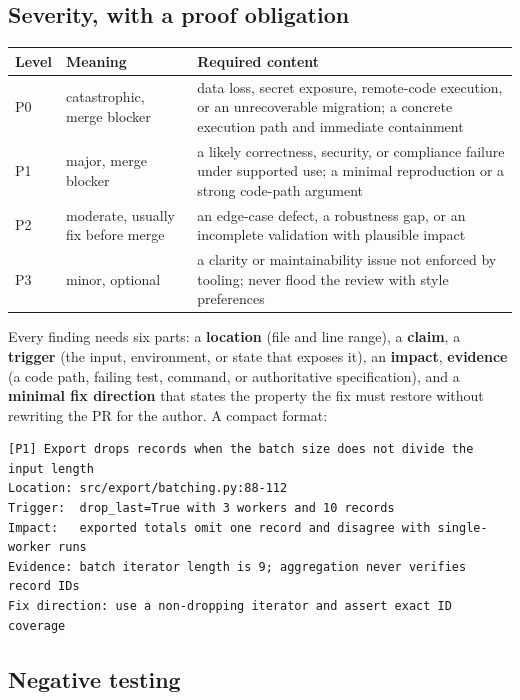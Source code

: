 \documentclass[11pt]{article}
\begin{document}
\subsection{Severity, with a proof obligation}

\begin{center}
\begin{tabularx}{\textwidth}{@{}l Y Y@{}}
\toprule
\textbf{Level} & \textbf{Meaning} & \textbf{Required content} \\
\midrule
P0 & catastrophic, merge blocker & data loss, secret exposure, remote-code execution, or an
  unrecoverable migration; a concrete execution path and immediate containment \\
P1 & major, merge blocker & a likely correctness, security, or compliance failure under
  supported use; a minimal reproduction or a strong code-path argument \\
P2 & moderate, usually fix before merge & an edge-case defect, a robustness gap, or an
  incomplete validation with plausible impact \\
P3 & minor, optional & a clarity or maintainability issue not enforced by tooling; never flood
  the review with style preferences \\
\bottomrule
\end{tabularx}
\end{center}

Every finding needs six parts: a \textbf{location} (file and line range), a \textbf{claim}, a
\textbf{trigger} (the input, environment, or state that exposes it), an \textbf{impact},
\textbf{evidence} (a code path, failing test, command, or authoritative specification), and a
\textbf{minimal fix direction} that states the property the fix must restore without rewriting
the PR for the author. A compact format:

\begin{lstlisting}[style=gw]
[P1] Export drops records when the batch size does not divide the input length
Location: src/export/batching.py:88-112
Trigger:  drop_last=True with 3 workers and 10 records
Impact:   exported totals omit one record and disagree with single-worker runs
Evidence: batch iterator length is 9; aggregation never verifies record IDs
Fix direction: use a non-dropping iterator and assert exact ID coverage
\end{lstlisting}

\subsection{Negative testing}
\end{document}
